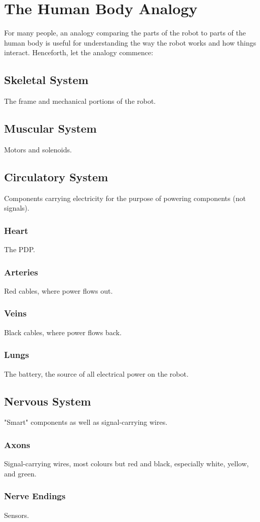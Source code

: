 \documentclass[]{report}
\begin{document}
\section{The Human Body Analogy}
	For many people, an analogy comparing the parts of the robot to parts of the human body is useful for understanding the way the robot works and how things interact.
	Henceforth, let the analogy commence:
\subsection*{Skeletal System}
The frame and mechanical portions of the robot.
\subsection*{Muscular System}
Motors and solenoids.
\subsection*{Circulatory System}
Components carrying electricity for the purpose of powering components (not signals).
\subsubsection*{Heart}
The PDP.
\subsubsection*{Arteries}
Red cables, where power flows out.
\subsubsection*{Veins}
Black cables, where power flows back.
\subsubsection*{Lungs}
The battery, the source of all electrical power on the robot.
\subsection*{Nervous System}
"Smart" components as well as signal-carrying wires.
\subsubsection*{Axons}
Signal-carrying wires, most colours but red and black, especially white, yellow, and green.
\subsubsection*{Nerve Endings}
Sensors.
\end{document}
